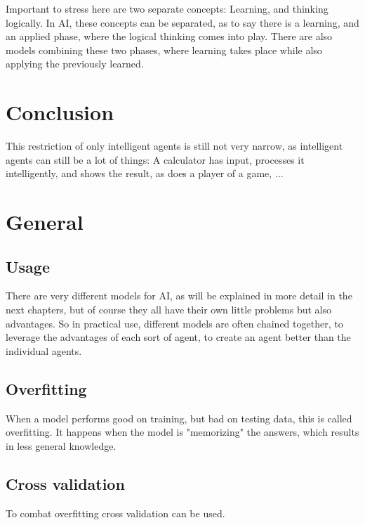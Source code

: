 Important to stress here are two separate concepts: Learning, and thinking logically.
In AI, these concepts can be separated, as to say there is a learning, and an applied phase, where the logical thinking comes into play. %
There are also models combining these two phases, where learning takes place while also applying the previously learned. %

\section{Conclusion}
This restriction of only intelligent agents is still not very narrow, as intelligent agents can still be a lot of things: A calculator has input, processes it intelligently, and shows the result, as does a player of a game, ...

\section{General}
\subsection{Usage}
There are very different models for AI, as will be explained in more detail in the next chapters, but of course they all have their own little problems but also advantages. So in practical use, different models are often chained together, to leverage the advantages of each sort of agent, to create an agent better than the individual agents. %
\subsection{Overfitting}
When a model performs good on training, but bad on testing data, this is called overfitting. It happens when the model is "memorizing" the answers, which results in less general knowledge.
\subsection{Cross validation}
To combat overfitting cross validation can be used.
